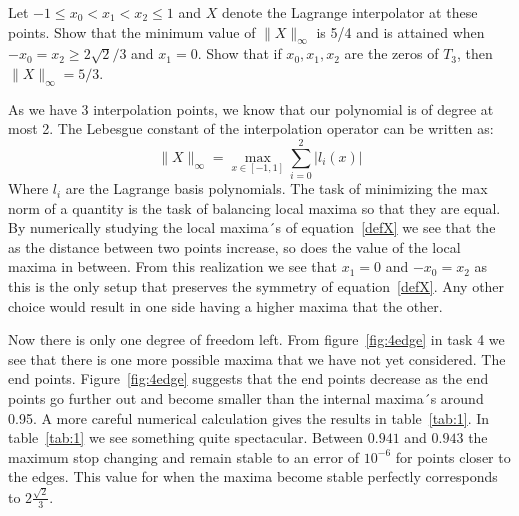 \begin{problem}
  Let $-1 \leq x_0 < x_1 < x_2 \leq 1$ and $X$ denote the Lagrange
  interpolator at these points. Show that the minimum value of
  $\lVert X \rVert_\infty$ is 5/4 and is attained when $-x_0 = x_2 \geq 2
  \sqrt{2}/3$ and $x_1 = 0$. Show that if $x_0 , x_1 , x_2$ are
  the zeros of $T_3$, then $\lVert X \rVert_\infty = 5/3$.
\end{problem}


\begin{solution}  
  As we have 3 interpolation points, we know that our polynomial is of
  degree at most 2. The Lebesgue constant of the interpolation
  operator can be written as:
  \begin{equation}
    \lVert X \rVert_{\infty} = \max_{x\in [-1,1]} \sum_{i=0}^2 \lvert l_i(x) \rvert
    \label{defX}
  \end{equation}
  Where $l_i$ are the Lagrange basis polynomials. The task of
  minimizing the max norm of a quantity is the task of balancing
  local maxima so that they are equal. By numerically studying the
  local maxima´s of equation~\ref{defX} we see that the as the distance between two
  points increase, so does the value of the local maxima in
  between. From this realization we see that $x_1= 0$ and
  $-x_0=x_2$ as this is the only setup that preserves the symmetry of
  equation~\ref{defX}. Any other choice would result in one side
  having a higher maxima that the other.

  Now there is only one degree of freedom left. From
  figure~\ref{fig:4edge} in task 4 we see that there is one more
  possible maxima that we have not yet considered. The end
  points. Figure~\ref{fig:4edge} suggests that the end points decrease
  as the end points go further out and become smaller than the
  internal maxima´s around 0.95. A more careful numerical calculation
  gives the results in table~\ref{tab:1}. In table~\ref{tab:1} we see
  something quite spectacular. Between $0.941$ and $0.943$ the maximum
  stop changing and remain stable to an error of $10^{-6}$ for points
  closer to the edges. This value for when the maxima become stable
  perfectly corresponds to $2\frac{\sqrt{2}}{3}$.


\end{solution}
